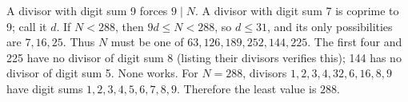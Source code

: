 A divisor with digit sum 9 forces $9\mid N$. A divisor with digit sum 7 is coprime to 9; call it $d$. If $N<288$, then $9d\le N<288$, so $d\le31$, and its only possibilities are $7,16,25$. Thus $N$ must be one of $63,126,189,252,144,225$. The first four and 225 have no divisor of digit sum 8 (listing their divisors verifies this); 144 has no divisor of digit sum 5. None works. For $N=288$, divisors $1,2,3,4,32,6,16,8,9$ have digit sums $1,2,3,4,5,6,7,8,9$. Therefore the least value is $\boxed{288}$.
